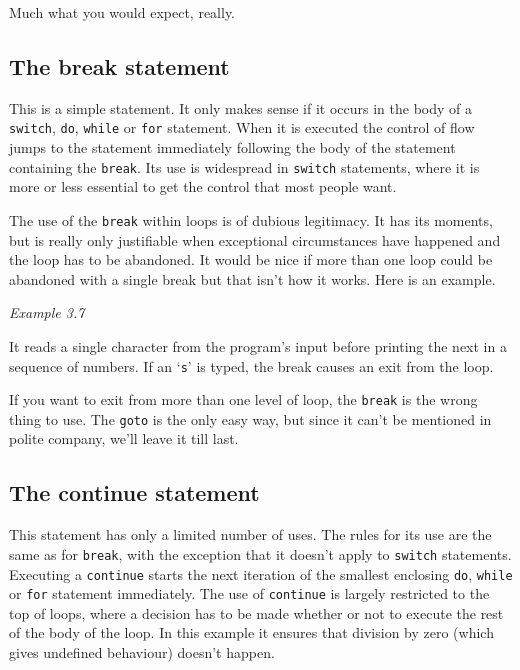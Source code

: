     Much what you would expect, really.


   

  

  \subsection{The break statement}
   

   This is a simple statement. It only makes sense if it occurs in the body
    of a \texttt{switch}, \texttt{do}, \texttt{while} or
    \texttt{for} statement. When it is executed the control of flow jumps
    to the statement immediately following the body of the statement
    containing the \texttt{break}. Its use is widespread in
    \texttt{switch} statements, where it is more or less essential to get
    the control that most people want.


   The use of the \texttt{break} within loops is of dubious legitimacy.
    It has its moments, but is really only justifiable when exceptional
    circumstances have happened and the loop has to be abandoned. It would be
    nice if more than one loop could be abandoned with a single break but that
    isn't how it works. Here is an example.


   \begin{center}\textit{Example 3.7}\end{center}


   It reads a single character from the program's input before printing the
    next in a sequence of numbers. If an `\texttt{s}' is typed, the
    break causes an exit from the loop.


   If you want to exit from more than one level of loop, the
    \texttt{break} is the wrong thing to use. The \texttt{goto} is the
    only easy way, but since it can't be mentioned in polite company, we'll
    leave it till last.


  

  \subsection{The continue statement}
   

   This statement has only a limited number of uses. The rules for its use
    are the same as for \texttt{break}, with the exception that it doesn't
    apply to \texttt{switch} statements. Executing a \texttt{continue}
    starts the next iteration of the smallest enclosing \texttt{do},
    \texttt{while} or \texttt{for} statement immediately. The use of
    \texttt{continue} is largely restricted to the top of loops, where a
    decision has to be made whether or not to execute the rest of the body of
    the loop. In this example it ensures that division by zero (which gives
    undefined behaviour) doesn't happen.


